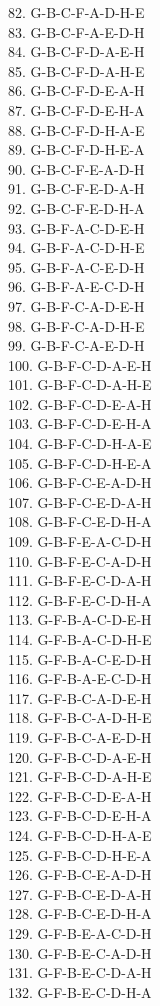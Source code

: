 \documentclass[10pt]{article}
\begin{document}
82. G-B-C-F-A-D-H-E \\
83. G-B-C-F-A-E-D-H \\
84. G-B-C-F-D-A-E-H \\
85. G-B-C-F-D-A-H-E \\
86. G-B-C-F-D-E-A-H \\
87. G-B-C-F-D-E-H-A \\
88. G-B-C-F-D-H-A-E \\
89. G-B-C-F-D-H-E-A \\
90. G-B-C-F-E-A-D-H \\
91. G-B-C-F-E-D-A-H \\
92. G-B-C-F-E-D-H-A \\
93. G-B-F-A-C-D-E-H \\
94. G-B-F-A-C-D-H-E \\
95. G-B-F-A-C-E-D-H \\
96. G-B-F-A-E-C-D-H \\
97. G-B-F-C-A-D-E-H \\
98. G-B-F-C-A-D-H-E \\
99. G-B-F-C-A-E-D-H \\
100. G-B-F-C-D-A-E-H \\
101. G-B-F-C-D-A-H-E \\
102. G-B-F-C-D-E-A-H \\
103. G-B-F-C-D-E-H-A \\
104. G-B-F-C-D-H-A-E \\
105. G-B-F-C-D-H-E-A \\
106. G-B-F-C-E-A-D-H \\
107. G-B-F-C-E-D-A-H \\
108. G-B-F-C-E-D-H-A \\
109. G-B-F-E-A-C-D-H \\
110. G-B-F-E-C-A-D-H \\
111. G-B-F-E-C-D-A-H \\
112. G-B-F-E-C-D-H-A \\
113. G-F-B-A-C-D-E-H \\
114. G-F-B-A-C-D-H-E \\
115. G-F-B-A-C-E-D-H \\
116. G-F-B-A-E-C-D-H \\
117. G-F-B-C-A-D-E-H \\
118. G-F-B-C-A-D-H-E \\
119. G-F-B-C-A-E-D-H \\
120. G-F-B-C-D-A-E-H \\
121. G-F-B-C-D-A-H-E \\
122. G-F-B-C-D-E-A-H \\
123. G-F-B-C-D-E-H-A \\
124. G-F-B-C-D-H-A-E \\
125. G-F-B-C-D-H-E-A \\
126. G-F-B-C-E-A-D-H \\
127. G-F-B-C-E-D-A-H \\
128. G-F-B-C-E-D-H-A \\
129. G-F-B-E-A-C-D-H \\
130. G-F-B-E-C-A-D-H \\
131. G-F-B-E-C-D-A-H \\
132. G-F-B-E-C-D-H-A \\
\end{document}
